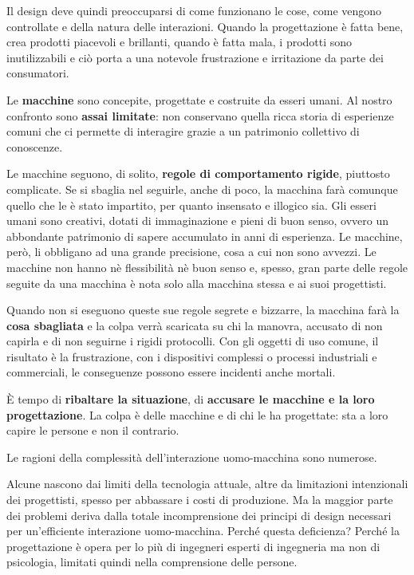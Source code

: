\documentclass[a4paper,11pt,oneside]{book}
\begin{document}
Il design deve quindi preoccuparsi di come funzionano le cose, come vengono controllate e della natura delle interazioni. Quando la progettazione è fatta bene, crea prodotti piacevoli e brillanti, quando è fatta mala, i prodotti sono inutilizzabili e ciò porta a una notevole frustrazione e irritazione da parte dei consumatori.

Le \textbf{macchine} sono concepite, progettate e costruite da esseri umani. Al nostro confronto sono \textbf{assai limitate}: non conservano quella ricca storia di esperienze comuni che ci permette di interagire grazie a un patrimonio collettivo di conoscenze.

Le macchine seguono, di solito, \textbf{regole di comportamento rigide}, piuttosto complicate. Se si sbaglia nel seguirle, anche di poco, la macchina farà comunque quello che le è stato impartito, per quanto insensato e illogico sia. Gli esseri umani sono creativi, dotati di immaginazione e pieni di buon senso, ovvero un abbondante patrimonio di sapere accumulato in anni di esperienza. Le macchine, però, li obbligano ad una grande precisione, cosa a cui non sono avvezzi. Le macchine non hanno nè flessibilità nè buon senso e, spesso, gran parte delle regole seguite da una macchina è nota solo alla macchina stessa e ai suoi progettisti.

Quando non si eseguono queste sue regole segrete e bizzarre, la macchina farà la \textbf{cosa sbagliata} e la colpa verrà scaricata su chi la manovra, accusato di non capirla e di non seguirne i rigidi protocolli. Con gli oggetti di uso comune, il risultato è la frustrazione, con i dispositivi complessi o processi industriali e commerciali, le conseguenze possono essere incidenti anche mortali.

È tempo di \textbf{ribaltare la situazione}, di \textbf{accusare le macchine e la loro progettazione}. La colpa è delle macchine e di chi le ha progettate: sta a loro capire le persone e non il contrario.

Le ragioni della complessità dell'interazione uomo-macchina sono numerose.

Alcune nascono dai limiti della tecnologia attuale, altre da limitazioni intenzionali dei progettisti, spesso per abbassare i costi di produzione. Ma la maggior parte dei problemi deriva dalla totale incomprensione dei principi di design necessari per un'efficiente interazione uomo-macchina. Perché questa deficienza? Perché la progettazione è opera per lo più di ingegneri esperti di ingegneria ma non di psicologia, limitati quindi nella comprensione delle persone.
\end{document}
